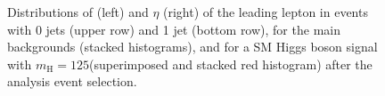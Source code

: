 \begin{figure}
{}
\caption{Distributions of \pt (left) and $\eta$ (right) of the leading lepton in events with 0 jets (upper row) and 1 jet (bottom row), for the main backgrounds (stacked histograms), and for a SM Higgs boson signal with $m_\mathrm{H}=125$\GeV (superimposed and stacked red histogram)  after the analysis event selection.}\label{fig:distr1}
\end{figure}

